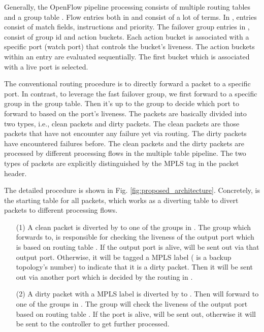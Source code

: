 \documentclass[10pt,journal]{IEEEtran}
\begin{document}
Generally, the OpenFlow pipeline processing consists of multiple routing tables   and a group table .
Flow entries both in  and  consist of a lot of terms. In , entries consist of match fields, instructions and priority. The failover group entries in , consist of group id and action buckets. Each action bucket is associated with a specific port (watch port) that controls the bucket's liveness. The action buckets within an entry are evaluated sequentially. The first bucket which is associated with a live port is selected.

The conventional routing procedure is to directly forward a packet  to a specific port. In contrast, to leverage the fast failover group, we first forward  to a specific group in the group table. Then it's up to the group to decide which port to forward to based on the port's liveness. The packets are basically divided into two types, i.e., clean packets and dirty packets. The clean packets are those packets that have not encounter any failure yet via routing. The dirty packets have encountered failures before. The clean packets and the dirty packets are processed by different processing flows in the multiple table pipeline. The two types of packets are explicitly distinguished by the MPLS tag in the packet header.

The detailed procedure is shown in Fig. \ref{fig:proposed_architecture}. Concretely,  is the starting table for all packets, which works as a diverting table to divert packets to different processing flows.
\begin{enumerate}
\item[(1)] A clean packet  is diverted by  to one of the groups in . The group which  forwards  to, is responsible for checking the liveness of the output port which is based on routing table . If the output port is alive,  will be sent out via that output port. Otherwise, it will be tagged a MPLS label  ( is a backup topology's number) to indicate that it is a dirty packet. Then it will be sent out via another port which is decided by the routing in .
\item[(2)] A dirty packet  with a MPLS label  is diverted by  to . Then  will forward  to one of the groups in . The group will check the liveness of the output port based on routing table . If the port is alive,  will be sent out, otherwise it will be sent to the controller to get further processed.
\end{enumerate}
\end{document}
